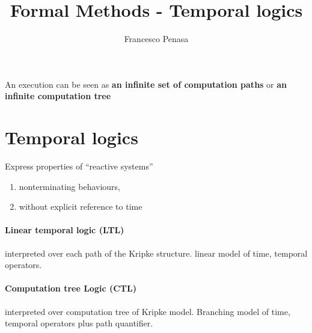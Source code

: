 \documentclass[11pt]{article}
\begin{document}
\author{Francesco Penasa}
\title{Formal Methods - Temporal logics}
\maketitle

\medskip

An execution can be seen as \textbf{an infinite set of computation paths} or \textbf{an infinite computation tree}

\section{Temporal logics} %
\label{sec:temporal_logics}
Express properties of ``reactive systems''
\begin{enumerate}
	\item nonterminating behaviours,
	\item without explicit reference to time
\end{enumerate}

\paragraph{Linear temporal logic (LTL)} %
\label{par:linear_temporal_lock_}
interpreted over each path of the Kripke structure.
linear model of time, temporal operators.

\paragraph{Computation tree Logic (CTL)} %
\label{par:computation_tree_logic_}
interpreted over computation tree of Kripke model.
Branching model of time, temporal operators plus path quantifier.
\end{document}
